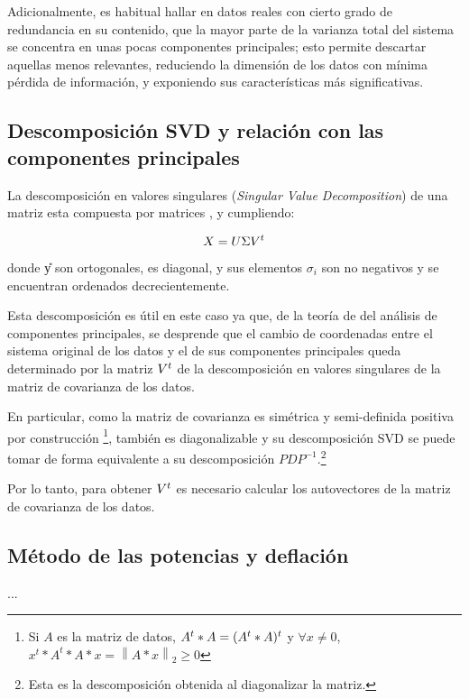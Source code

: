 Adicionalmente, es habitual hallar en datos reales con cierto grado de redundancia en su contenido, que la mayor parte de la varianza total del sistema se concentra en unas pocas componentes principales; esto permite descartar aquellas menos relevantes, reduciendo la dimensión de los datos con mínima pérdida de información, y exponiendo sus características más significativas.

\subsection{Descomposición SVD y relación con las componentes principales}

La descomposición en valores singulares (\emph{Singular Value Decomposition}) de una matriz \decMat{\X}{\M}{\N} esta compuesta por matrices \decMat{\U}{\M}{\M}, \decMat{\Sig}{\M}{\N} y \decMat{\V}{\N}{\N} cumpliendo:

$$X = U \Sigma V^{t}$$

donde \U y \V son ortogonales, \Sig es diagonal, y sus elementos $\sigma_i$ son no negativos y se encuentran ordenados decrecientemente.

Esta descomposición es útil en este caso ya que, de la teoría de del análisis de componentes principales, se desprende que el cambio de coordenadas entre el sistema original de los datos y el de sus componentes principales queda determinado por la matriz $V^{t}$ de la descomposición en valores singulares de la matriz de covarianza de los datos.

En particular, como la matriz de covarianza es simétrica y semi-definida positiva por construcción \footnote{Si $A$ es la matriz de datos, $A^{t} * A = (A^{t} * A)^{t}$ y $\forall x \neq 0$, $x^t * A^t * A * x = \left \| A*x \right \|_2 \geq 0$}, también es diagonalizable y su descomposición SVD se puede tomar de forma equivalente a su descomposición $PDP^{-1}$.\footnote{Esta es la descomposición obtenida al diagonalizar la matriz.}

Por lo tanto, para obtener $V^{t}$ es necesario calcular los autovectores de la matriz de covarianza de los datos.

\subsection{Método de las potencias y deflación}

...